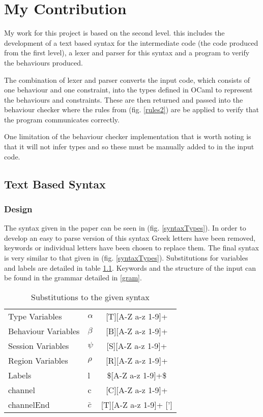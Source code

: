 \chapter{My Contribution} \label{chapMyWork}

My work for this project is based on the second level. this includes the development of a text based syntax for the intermediate code (the code produced from the first level), a lexer and parser for this syntax and a program to verify the behaviours produced. 

The combination of lexer and parser converts the input code, which consists of one behaviour and one constraint, into the types defined in OCaml to represent the behaviours and constraints. These are then returned and passed into the behaviour checker where the rules from (fig. \ref{rules2}) are be applied to verify that the program communicates correctly. 

One limitation of the behaviour checker implementation that is worth noting is that it will not infer types and so these must be manually added to in the input code. 

\section{Text Based Syntax} \label{text}

\subsection {Design} 
The syntax given in the paper can be seen in (fig. \ref{syntaxTypes}). In order to develop an easy to parse version of this syntax Greek letters have been removed, keywords or individual letters have been chosen to replace them. The final syntax is very similar to that given in (fig. \ref{syntaxTypes}). Substitutions for variables and labels are detailed in table \ref{tabSyntaxSubs}. Keywords and the structure of the input can be found in the grammar detailed in \ref{gram}.

\begin{table}
\centering
\begin{tabular}{l l c }
Type Variables & $\alpha$ & [T][A-Z a-z 1-9]+ \\
Behaviour Variables &$\beta$ & [B][A-Z a-z 1-9]+ \\
Session Variables & $\psi$ & [S][A-Z a-z 1-9]+ \\
Region Variables & $\rho$ & [R][A-Z a-z 1-9]+ \\
Labels & l & \$[A-Z a-z 1-9]+\$ \\
channel & c & [C][A-Z a-z 1-9]+  \\
channelEnd & $\bar{c}$ &[T][A-Z a-z 1-9]+ ['] \\
\end{tabular}
\caption{Substitutions to the given syntax}
\label{tabSyntaxSubs}
\end{table}

